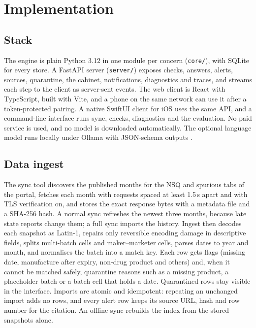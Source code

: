 \section{Implementation}
\label{sec:impl}

\subsection{Stack}
The engine is plain Python 3.12 in one module per concern (\texttt{core/}), with SQLite for every store. A FastAPI server (\texttt{server/}) exposes checks, answers, alerts, sources, quarantine, the cabinet, notifications, diagnostics and traces, and streams each step to the client as server-sent events. The web client is React with TypeScript, built with Vite, and a phone on the same network can use it after a token-protected pairing. A native SwiftUI client for iOS uses the same API, and a command-line interface runs sync, checks, diagnostics and the evaluation. No paid service is used, and no model is downloaded automatically. The optional language model runs locally under Ollama with JSON-schema outputs \cite{ollama2026structured}.

\subsection{Data ingest}
The sync tool discovers the published months for the NSQ and spurious tabs of the portal, fetches each month with requests spaced at least 1.5\,s apart and with TLS verification on, and stores the exact response bytes with a metadata file and a SHA-256 hash. A normal sync refreshes the newest three months, because late state reports change them; a full sync imports the history. Ingest then decodes each snapshot as Latin-1, repairs only reversible encoding damage in descriptive fields, splits multi-batch cells and maker--marketer cells, parses dates to year and month, and normalises the batch into a match key. Each row gets flags (missing date, manufacture after expiry, non-drug product and others) and, when it cannot be matched safely, quarantine reasons such as a missing product, a placeholder batch or a batch cell that holds a date. Quarantined rows stay visible in the interface. Imports are atomic and idempotent: repeating an unchanged import adds no rows, and every alert row keeps its source URL, hash and row number for the citation. An offline sync rebuilds the index from the stored snapshots alone.

